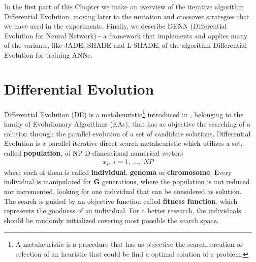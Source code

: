 \label{chap:differential-evolution}
In the first part of this Chapter we make an overview of the iterative algorithm Differential Evolution, moving later to the mutation and crossover strategies that we have used in the experiments. Finally, we describe DENN (Differential Evolution for Neural Network) - a framework that implements and applies many of the variants, like JADE, SHADE and L-SHADE, of the algorithm Differential Evolution for training ANNs.


\section{Differential Evolution}
Differential Evolution (DE) is a metaheuristic\footnote{A metaheuristic is a procedure that has as objective the search, creation or selection of an heuristic that could be find a optimal solution of a problem.} introduced in \cite{DESEHGOCS:1997}, belonging to the family of Evolutionary Algorithms (EAs), that has as objective the searching of a solution through the parallel evolution of a set of candidate solutions.\newline\newline
Differential Evolution is a parallel iterative direct search metaheuristic which utilizes a set, called \textbf{population}, of NP D-dimensional numerical vectors 
\begin{align}
	x_{i},\ i=1,\ \dots,\ NP 
\end{align}
where each of them is called \textbf{individual}, \textbf{genoma} or \textbf{chromosome}. Every individual is manipulated for \textbf{G} generations, where the population is not reduced nor incremented, looking for one individual that can be considered as solution. The search is guided by an objective function called \textbf{fitness function}, which represents the goodness of an individual. For a better research, the individuals should be randomly initialized covering most possible the search space.\newline
